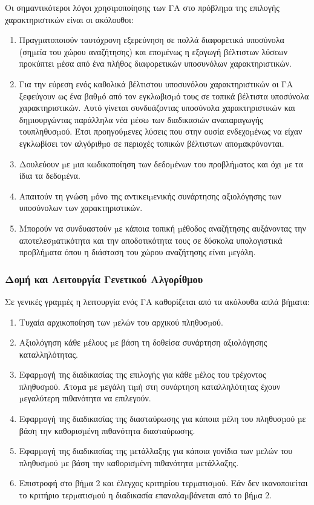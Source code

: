 Οι σημαντικότεροι λόγοι
χρησιµοποίησης των ΓΑ στο πρόβληµα της επιλογής χαρακτηριστικών είναι οι
ακόλουθοι:
\begin{enumerate}
\item Πραγµατοποιούν ταυτόχρονη εξερεύνηση σε πολλά διαφορετικά υποσύνολα (σηµεία του χώρου αναζήτησης) και εποµένως η εξαγωγή βέλτιστων λύσεων προκύπτει µέσα από ένα πλήθος διαφορετικών υποσυνόλων χαρακτηριστικών.
\item Για την εύρεση ενός καθολικά βέλτιστου υποσυνόλου χαρακτηριστικών οι ΓΑ ξεφεύγουν ως ένα βαθµό από τον εγκλωβισµό τους σε τοπικά βέλτιστα υποσύνολα χαρακτηριστικών. Αυτό γίνεται συνδυάζοντας υποσύνολα χαρακτηριστικών και δηµιουργώντας παράλληλα νέα µέσω των διαδικασιών αναπαραγωγής τουπληθυσµού. Έτσι προηγούµενες λύσεις που στην ουσία ενδεχοµένως να είχαν εγκλωβίσει τον αλγόριθµο σε περιοχές τοπικών βέλτιστων αποµακρύνονται.
\item Δουλεύουν µε µια κωδικοποίηση των δεδοµένων του προβλήµατος και όχι µε τα ίδια τα δεδοµένα.
\item Απαιτούν τη γνώση µόνο της αντικειµενικής συνάρτησης αξιολόγησης των υποσύνολων των χαρακτηριστικών.
\item Μπορούν να συνδυαστούν µε κάποια τοπική µέθοδος αναζήτησης αυξάνοντας την αποτελεσµατικότητα και την αποδοτικότητα τους σε δύσκολα υπολογιστικά προβλήµατα όπου η διάσταση του χώρου αναζήτησης είναι µεγάλη.
\end{enumerate}
\subsubsection{Δομή και Λειτουργία Γενετικού Αλγορίθμου}
Σε γενικές γραµµές η λειτουργία ενός ΓΑ καθορίζεται από τα ακόλουθα απλά
βήµατα:
\begin{enumerate}
\item Τυχαία αρχικοποίηση των µελών του αρχικού πληθυσµού.
\item Αξιολόγηση κάθε µέλους µε βάση τη δοθείσα συνάρτηση αξιολόγησης
καταλληλότητας.
\item  Εφαρµογή της διαδικασίας της επιλογής για κάθε µέλος του τρέχοντος πληθυσµού. Άτοµα µε µεγάλη τιµή στη συνάρτηση καταλληλότητας έχουν µεγαλύτερη πιθανότητα να επιλεγούν.
\item Εφαρµογή της διαδικασίας της διασταύρωσης για κάποια µέλη του πληθυσµού µε βάση την καθορισµένη πιθανότητα διασταύρωσης.
\item Εφαρµογή της διαδικασίας της µετάλλαξης για κάποια γονίδια των µελών του πληθυσµού µε βάση την καθορισµένη πιθανότητα µετάλλαξης.
\item Επιστροφή στο βήµα 2 και έλεγχος κριτηρίου τερµατισµού. Εάν δεν ικανοποιείται το κριτήριο τερµατισµού η διαδικασία επαναλαµβάνεται από το βήµα 2.
\end{enumerate}



